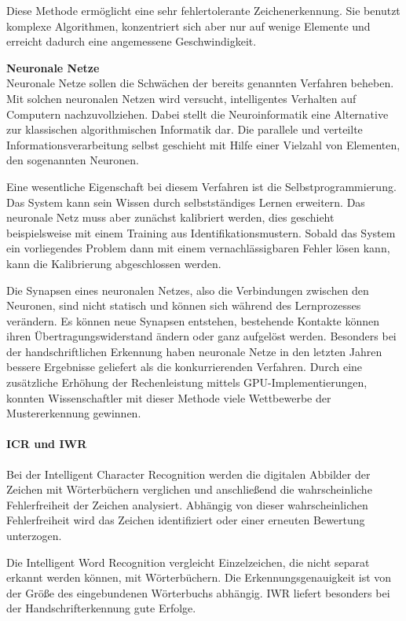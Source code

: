
Diese Methode ermöglicht eine sehr fehlertolerante Zeichenerkennung. Sie benutzt komplexe Algorithmen, konzentriert sich aber nur auf wenige Elemente und erreicht dadurch eine angemessene Geschwindigkeit. \cite{OCRB}

\textbf{Neuronale Netze}\\
Neuronale Netze sollen die Schwächen der bereits genannten Verfahren beheben. Mit solchen neuronalen Netzen wird versucht, intelligentes Verhalten auf Computern nachzuvollziehen. Dabei stellt die Neuroinformatik eine Alternative zur klassischen algorithmischen Informatik dar. Die parallele und verteilte Informationsverarbeitung selbst geschieht mit Hilfe einer Vielzahl von Elementen, den sogenannten Neuronen. \cite{OCRB}

Eine wesentliche Eigenschaft bei diesem Verfahren ist die Selbstprogrammierung. Das System kann sein Wissen durch selbstständiges Lernen erweitern. Das neuronale Netz muss aber zunächst kalibriert werden, dies geschieht beispielsweise mit einem Training aus Identifikationsmustern. Sobald das System ein vorliegendes Problem dann mit einem vernachlässigbaren Fehler lösen kann, kann die Kalibrierung abgeschlossen werden. \cite{OCRB}

\newpage

Die Synapsen eines neuronalen Netzes, also die Verbindungen zwischen den Neuronen, sind nicht statisch und können sich während des Lernprozesses verändern. Es können neue Synapsen entstehen, bestehende Kontakte können ihren Übertragungswiderstand ändern oder ganz aufgelöst werden. Besonders bei der handschriftlichen Erkennung haben neuronale Netze in den letzten Jahren bessere Ergebnisse geliefert als die konkurrierenden Verfahren. Durch eine zusätzliche Erhöhung der Rechenleistung mittels GPU-Implementierungen, konnten Wissenschaftler mit dieser Methode viele Wettbewerbe der Mustererkennung gewinnen. \cite{OCRB}

\paragraph{ICR und IWR}
Bei der Intelligent Character Recognition werden die digitalen Abbilder der Zeichen mit Wörterbüchern verglichen und anschließend  die wahrscheinliche Fehlerfreiheit der Zeichen analysiert. Abhängig von dieser wahrscheinlichen Fehlerfreiheit wird das Zeichen identifiziert oder einer erneuten Bewertung unterzogen. \cite{OCRB,OCRP}

Die Intelligent Word Recognition vergleicht Einzelzeichen, die nicht separat erkannt werden können, mit Wörterbüchern. Die Erkennungsgenauigkeit ist von der Größe des eingebundenen Wörterbuchs abhängig. IWR liefert besonders bei der Handschrifterkennung gute Erfolge. \cite{OCRB,OCRP}